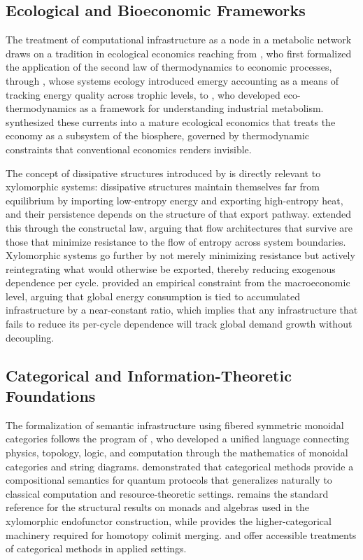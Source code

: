 \documentclass[11pt,a4paper]{article}
\theoremstyle{plain}
\theoremstyle{definition}
\theoremstyle{remark}
\begin{document}
\subsection{Ecological and Bioeconomic Frameworks}

The treatment of computational infrastructure as a node in a metabolic network
draws on a tradition in ecological economics reaching from \citet{georgescu1971},
who first formalized the application of the second law of thermodynamics to
economic processes, through \citet{odum1994}, whose systems ecology introduced
emergy accounting as a means of tracking energy quality across trophic levels,
to \citet{ayres1998}, who developed eco-thermodynamics as a framework for
understanding industrial metabolism. \citet{daly2011} synthesized these
currents into a mature ecological economics that treats the economy as a
subsystem of the biosphere, governed by thermodynamic constraints that
conventional economics renders invisible.

The concept of dissipative structures introduced by \citet{prigogine1977} is
directly relevant to xylomorphic systems: dissipative structures maintain
themselves far from equilibrium by importing low-entropy energy and exporting
high-entropy heat, and their persistence depends on the structure of that
export pathway. \citet{bejan2016} extended this through the constructal law,
arguing that flow architectures that survive are those that minimize resistance
to the flow of entropy across system boundaries. Xylomorphic systems go further
by not merely minimizing resistance but actively reintegrating what would
otherwise be exported, thereby reducing exogenous dependence per cycle.
\citet{garrett2011} provided an empirical constraint from the macroeconomic
level, arguing that global energy consumption is tied to accumulated
infrastructure by a near-constant ratio, which implies that any infrastructure
that fails to reduce its per-cycle dependence will track global demand growth
without decoupling.

\subsection{Categorical and Information-Theoretic Foundations}

The formalization of semantic infrastructure using fibered symmetric monoidal
categories follows the program of \citet{baez2010}, who developed a unified
language connecting physics, topology, logic, and computation through the
mathematics of monoidal categories and string diagrams. \citet{abramsky2004}
demonstrated that categorical methods provide a compositional semantics for
quantum protocols that generalizes naturally to classical computation and
resource-theoretic settings. \citet{maclane1998} remains the standard reference
for the structural results on monads and algebras used in the xylomorphic
endofunctor construction, while \citet{lurie2009} provides the higher-categorical
machinery required for homotopy colimit merging. \citet{leinster2014} and
\citet{spivak2014} offer accessible treatments of categorical methods in applied
settings.
\end{document}
